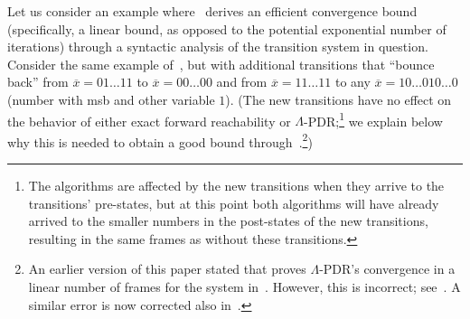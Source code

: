 \documentclass[acmsmall,screen]{acmart}
\newcommand{\ov}{\overline}
\renewcommand{\vec}{\ov}
\begin{document}
%
Let us consider an example where~ derives an efficient convergence bound (specifically, a linear bound, as opposed to the potential exponential number of iterations) through a syntactic analysis of the transition system in question.
%
Consider the same example of~, but with additional transitions that ``bounce back'' from $\vec{x}=01\ldots11$ to $\vec{x}=00\ldots00$ and from $\vec{x}=11\ldots11$ to any $\vec{x}=10\ldots010\ldots0$ (number with msb and other variable $1$).  
(The new transitions have no effect on the behavior of either exact forward reachability or $\Lambda$-PDR;\footnote{
  The algorithms are affected by the new transitions when they arrive to the transitions' pre-states, but at this point both algorithms will have already arrived to the smaller numbers in the post-states of the new transitions, resulting in the same frames as without these transitions.
 }
 we explain below why this is needed to obtain a good bound through~.\footnote{
	 An earlier version of this paper stated that  proves $\Lambda$-PDR's convergence in a linear number of frames for the system in~. However, this is incorrect; see~. A similar error is now corrected also in~.
%
})
\end{document}
